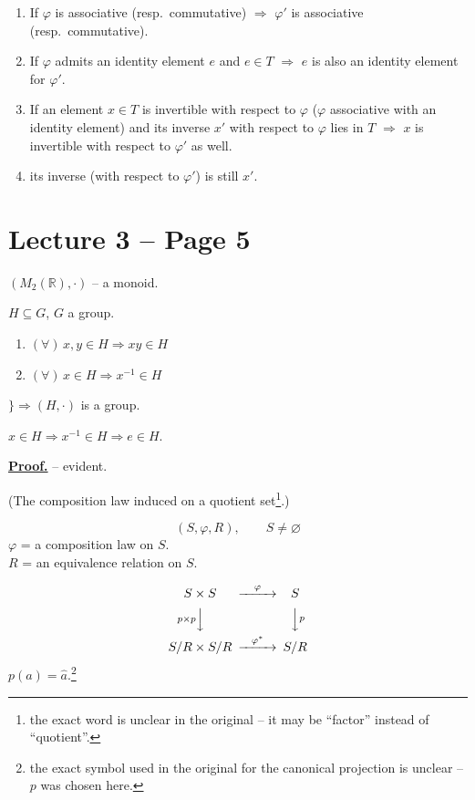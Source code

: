 \begin{enumerate}
\item[(1)] If $\varphi$ is associative (resp.\ commutative) $\Rightarrow$ $\varphi'$ is associative (resp.\ commutative).
\item[(2)] If $\varphi$ admits an identity element $e$ and $e\in T$ $\Rightarrow$ $e$ is also an identity element for $\varphi'$.
\item[(3)] If an element $x\in T$ is invertible with respect to $\varphi$ ($\varphi$ associative with an identity element) and its inverse $x'$ with respect to $\varphi$ lies in $T$ $\Rightarrow$ $x$ is invertible with respect to $\varphi'$ as well.
\item[(4)] its inverse (with respect to $\varphi'$) is still $x'$.
\end{enumerate}




\section*{Lecture 3 -- Page 5}

\noindent $(M_2(\mathbb{R}),\cdot)$ -- a monoid.

\noindent $H\subseteq G$, $G$ a group.

\begin{enumerate}
\item[1)] $(\forall)\, x,y\in H \Rightarrow xy\in H$
\item[2)] $(\forall)\, x\in H \Rightarrow x^{-1}\in H$
\end{enumerate}
\hspace{1cm}$\Bigg\} \Rightarrow (H,\cdot)$ is a group.

\noindent $x\in H \Rightarrow x^{-1}\in H \Rightarrow e\in H$.

\bigskip
\noindent\underline{\textbf{Proof.}} -- evident.

\bigskip
\noindent (The composition law induced on a quotient set\footnote{the exact word is unclear in the original -- it may be ``factor'' instead of ``quotient''.}.)

\[
(S,\varphi,R), \qquad S\neq\varnothing
\]
\noindent $\varphi$ = a composition law on $S$.\\
$R$ = an equivalence relation on $S$.

\[
\begin{CD}
S\times S @>\varphi>> S\\
@V{p\times p}VV @VV{p}V\\
S/R\times S/R @>\varphi^*>> S/R
\end{CD}
\]
\noindent $p(a) = \hat a$.\footnote{the exact symbol used in the original for the canonical projection is unclear -- $p$ was chosen here.}

